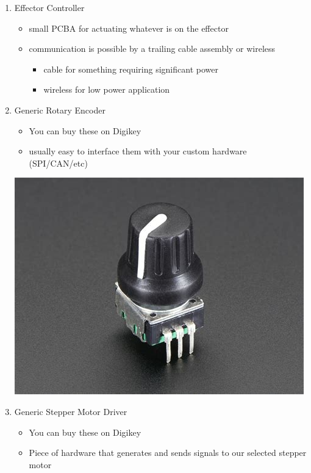 \documentclass[11pt]{article}
\begin{document}
\begin{enumerate}
\item Effector Controller
\label{sec:orgfa1fe99}

\begin{itemize}
\item small PCBA for actuating whatever is on the effector
\item communication is possible by a trailing cable assembly or wireless
\begin{itemize}
\item cable for something requiring significant power
\item wireless for low power application
\end{itemize}
\end{itemize}

\item Generic Rotary Encoder
\label{sec:org8863021}

\begin{itemize}
\item You can buy these on Digikey
\item usually easy to interface them with your custom hardware (SPI/CAN/etc)
\end{itemize}

\begin{center}
\includegraphics[width=.9\linewidth]{Electronics_Modules/2022-07-18_13-48-01_screenshot.png}
\end{center}

\item Generic Stepper Motor Driver
\label{sec:org2cf24f3}

\begin{itemize}
\item You can buy these on Digikey
\item Piece of hardware that generates and sends signals to our selected stepper motor
\end{itemize}


\end{enumerate}
\end{document}
